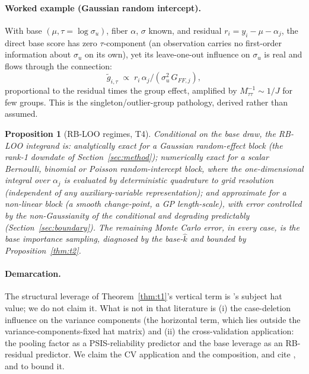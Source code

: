 \documentclass[11pt]{article}
\newtheorem{proposition}{Proposition}
\newcommand{\khat}{\hat{k}}
\begin{document}
\paragraph{Worked example (Gaussian random intercept).} With base
$(\mu,\tau=\log\sigma_u)$, fiber $\alpha$, $\sigma$ known, and residual
$r_i = y_i-\mu-\alpha_j$, the direct base score has zero $\tau$-component (an
observation carries no first-order information about $\sigma_u$ on its own), yet
its leave-one-out influence on $\sigma_u$ is real and flows through the connection:
\[
\tilde g_{i,\tau} \;\propto\; r_i\,\alpha_j / (\sigma_u^2\, G_{FF,j}),
\]
proportional to the residual times the group effect, amplified by $M^{-1}_{\tau\tau}\sim 1/J$
for few groups. This is the singleton/outlier-group pathology, derived rather than
assumed.

\begin{proposition}[RB-LOO regimes, T4]\label{thm:t4}
Conditional on the base draw, the RB-LOO integrand is: \emph{analytically exact}
for a Gaussian random-effect block (the rank-1 downdate of
Section~\ref{sec:method}); \emph{numerically exact} for a scalar Bernoulli,
binomial or Poisson random-intercept block, where the one-dimensional integral over
$\alpha_j$ is evaluated by deterministic quadrature to grid resolution (independent
of any auxiliary-variable representation); and \emph{approximate} for a non-linear
block (a smooth change-point, a GP length-scale), with error controlled by the
non-Gaussianity of the conditional and degrading predictably
(Section~\ref{sec:boundary}). The remaining Monte Carlo error, in every case, is
the base importance sampling, diagnosed by the base-$\khat$ and bounded by
Proposition~\ref{thm:t2}.
\end{proposition}

\paragraph{Demarcation.} The structural leverage of Theorem~\ref{thm:t1}'s
vertical term is \citet{lovison2026augmented}'s subject hat value; we do not claim
it. What is not in that literature is (i) the case-deletion influence on the
variance components (the horizontal term, which lies outside the
variance-components-fixed hat matrix) and (ii) the cross-validation
application: the pooling factor as a PSIS-reliability predictor and the base
leverage as an RB-residual predictor. We claim the CV application and the
composition, and cite \citet{lovison2026augmented}, \citet{cui2010partitioning}
and \citet{wei1998generalized} to bound it.
\end{document}
